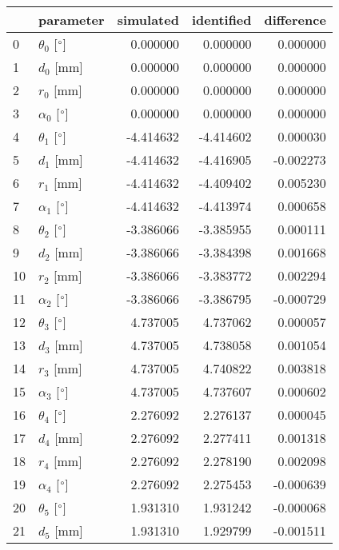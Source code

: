 \documentclass{standalone}%
\begin{document}
%
\normalsize%
\begin{tabular}{llrrr}
\toprule
{} &                 parameter & simulated & identified & difference \\
\midrule
0  &  $\theta_{0}$ [$\degree$] &  0.000000 &   0.000000 &   0.000000 \\
1  &              $d_{0}$ [mm] &  0.000000 &   0.000000 &   0.000000 \\
2  &              $r_{0}$ [mm] &  0.000000 &   0.000000 &   0.000000 \\
3  &  $\alpha_{0}$ [$\degree$] &  0.000000 &   0.000000 &   0.000000 \\
4  &  $\theta_{1}$ [$\degree$] & -4.414632 &  -4.414602 &   0.000030 \\
5  &              $d_{1}$ [mm] & -4.414632 &  -4.416905 &  -0.002273 \\
6  &              $r_{1}$ [mm] & -4.414632 &  -4.409402 &   0.005230 \\
7  &  $\alpha_{1}$ [$\degree$] & -4.414632 &  -4.413974 &   0.000658 \\
8  &  $\theta_{2}$ [$\degree$] & -3.386066 &  -3.385955 &   0.000111 \\
9  &              $d_{2}$ [mm] & -3.386066 &  -3.384398 &   0.001668 \\
10 &              $r_{2}$ [mm] & -3.386066 &  -3.383772 &   0.002294 \\
11 &  $\alpha_{2}$ [$\degree$] & -3.386066 &  -3.386795 &  -0.000729 \\
12 &  $\theta_{3}$ [$\degree$] &  4.737005 &   4.737062 &   0.000057 \\
13 &              $d_{3}$ [mm] &  4.737005 &   4.738058 &   0.001054 \\
14 &              $r_{3}$ [mm] &  4.737005 &   4.740822 &   0.003818 \\
15 &  $\alpha_{3}$ [$\degree$] &  4.737005 &   4.737607 &   0.000602 \\
16 &  $\theta_{4}$ [$\degree$] &  2.276092 &   2.276137 &   0.000045 \\
17 &              $d_{4}$ [mm] &  2.276092 &   2.277411 &   0.001318 \\
18 &              $r_{4}$ [mm] &  2.276092 &   2.278190 &   0.002098 \\
19 &  $\alpha_{4}$ [$\degree$] &  2.276092 &   2.275453 &  -0.000639 \\
20 &  $\theta_{5}$ [$\degree$] &  1.931310 &   1.931242 &  -0.000068 \\
21 &              $d_{5}$ [mm] &  1.931310 &   1.929799 &  -0.001511 \\

\end{tabular}
\end{document}
